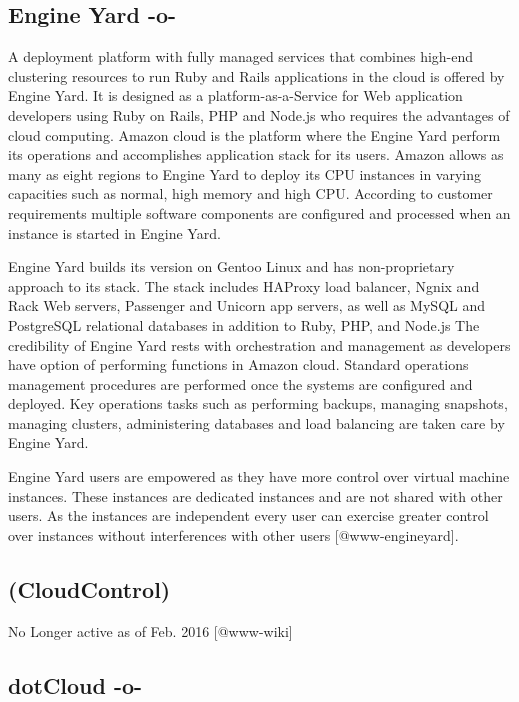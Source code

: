 \subsection{Engine Yard -o-}

A deployment platform with fully managed services that combines
high-end clustering resources to run Ruby and Rails applications in
the cloud is offered by Engine Yard. It is designed as a
platform-as-a-Service for Web application developers using Ruby on
Rails, PHP and Node.js who requires the advantages of cloud
computing. Amazon cloud is the platform where the Engine Yard perform
its operations and accomplishes application stack for its
users. Amazon allows as many as eight regions to Engine Yard to deploy
its CPU instances in varying capacities such as normal, high memory
and high CPU. According to customer requirements multiple software
components are configured and processed when an instance is started in
Engine Yard.
    
Engine Yard builds its version on Gentoo Linux and has non-proprietary
approach to its stack. The stack includes HAProxy load balancer, Ngnix
and Rack Web servers, Passenger and Unicorn app servers, as well as
MySQL and PostgreSQL relational databases in addition to Ruby, PHP,
and Node.js The credibility of Engine Yard rests with orchestration
and management as developers have option of performing functions in
Amazon cloud. Standard operations management procedures are performed
once the systems are configured and deployed. Key operations tasks
such as performing backups, managing snapshots, managing clusters,
administering databases and load balancing are taken care by Engine
Yard.
    
Engine Yard users are empowered as they have more control over virtual
machine instances. These instances are dedicated instances and are not
shared with other users. As the instances are independent every user
can exercise greater control over instances without interferences with
other users [@www-engineyard].




\subsection{ (CloudControl)}

No Longer active as of Feb. 2016 [@www-wiki]

\subsection{dotCloud -o-}

